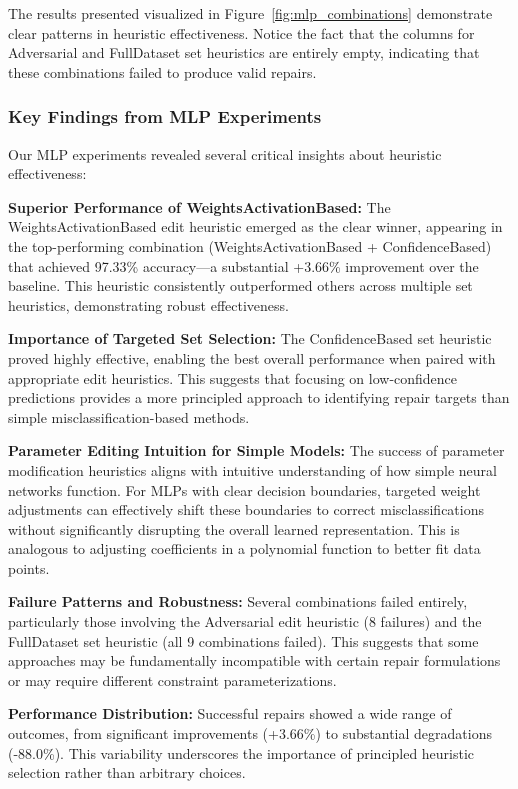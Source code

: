 \documentclass{article}
\begin{document}
The results presented visualized in Figure~\ref{fig:mlp_combinations} demonstrate clear patterns in heuristic effectiveness.
Notice the fact that the columns for Adversarial and FullDataset set heuristics are entirely empty, indicating that these combinations failed to produce valid repairs.

\subsubsection{Key Findings from MLP Experiments}

Our MLP experiments revealed several critical insights about heuristic effectiveness:

\textbf{Superior Performance of WeightsActivationBased:} The WeightsActivationBased edit heuristic emerged as the clear winner, appearing in the top-performing combination (WeightsActivationBased + ConfidenceBased) that achieved 97.33\% accuracy—a substantial +3.66\% improvement over the baseline. This heuristic consistently outperformed others across multiple set heuristics, demonstrating robust effectiveness.

\textbf{Importance of Targeted Set Selection:} The ConfidenceBased set heuristic proved highly effective, enabling the best overall performance when paired with appropriate edit heuristics. This suggests that focusing on low-confidence predictions provides a more principled approach to identifying repair targets than simple misclassification-based methods.

\textbf{Parameter Editing Intuition for Simple Models:} The success of parameter modification heuristics aligns with intuitive understanding of how simple neural networks function. For MLPs with clear decision boundaries, targeted weight adjustments can effectively shift these boundaries to correct misclassifications without significantly disrupting the overall learned representation. This is analogous to adjusting coefficients in a polynomial function to better fit data points.

\textbf{Failure Patterns and Robustness:} Several combinations failed entirely, particularly those involving the Adversarial edit heuristic (8 failures) and the FullDataset set heuristic (all 9 combinations failed). This suggests that some approaches may be fundamentally incompatible with certain repair formulations or may require different constraint parameterizations.

\textbf{Performance Distribution:} Successful repairs showed a wide range of outcomes, from significant improvements (+3.66\%) to substantial degradations (-88.0\%). This variability underscores the importance of principled heuristic selection rather than arbitrary choices.
\end{document}
